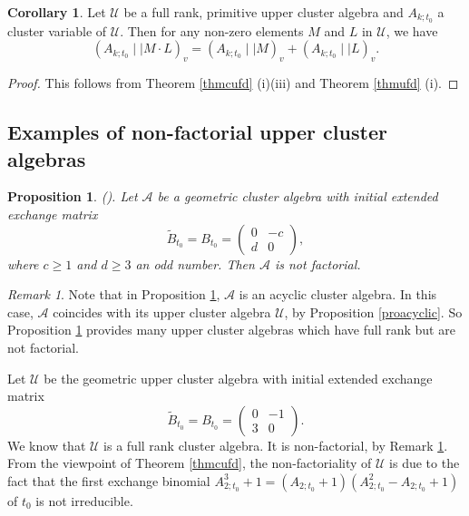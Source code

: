 \documentclass{amsart}
\newtheorem{proposition}[theorem]{Proposition}
\theoremstyle{definition}
\newtheorem{corollary}[theorem]{Corollary}
\theoremstyle{remark}
\newtheorem{remark}[theorem]{Remark}
\numberwithin{equation}{section}
\begin{document}
\begin{corollary}\label{corzp}
Let $\mathcal U$ be a full rank, primitive upper cluster algebra and $A_{k;t_0}$ a cluster variable of $\mathcal U$. Then for any non-zero elements $M$ and $L$ in $\mathcal U$, we have
$$(A_{k;t_0}\mid\mid M\cdot L)_v=(A_{k;t_0}\mid\mid M)_v+(A_{k;t_0}\mid\mid L)_v.$$
\end{corollary}
\begin{proof}
This follows from Theorem \ref{thmcufd} (i)(iii) and Theorem \ref{thmufd} (i).
\end{proof}




\subsection{Examples of non-factorial upper cluster algebras}\label{sec43}


\begin{proposition}{\rm (}\cite[Corollary 6.5]{GLS13}{\rm ).}
\label{corgls}
Let $\mathcal A$ be a geometric cluster algebra with initial extended exchange matrix $$\widetilde B_{t_0}= B_{t_0}=\begin{pmatrix}0&-c\\d&0\end{pmatrix},$$
where $c\geq1$ and $d\geq3$ an odd number. Then $\mathcal A$ is not factorial.
\end{proposition}


\begin{remark}\label{rmknonfactorial}
Note that in Proposition \ref{corgls}, $\mathcal A$ is an acyclic cluster algebra. In this case, $\mathcal A$ coincides with its upper cluster algebra $\mathcal U$, by Proposition \ref{proacyclic}. So Proposition \ref{corgls} provides many upper cluster algebras which have full rank but are not factorial.
\end{remark}

Let $\mathcal U$ be the  geometric upper cluster algebra with initial extended exchange matrix $$\widetilde B_{t_0}= B_{t_0}=\begin{pmatrix}0&-1\\3&0\end{pmatrix}.$$
We know that $\mathcal U$ is a full rank cluster algebra.  It is non-factorial, by Remark \ref{rmknonfactorial}. From the viewpoint of Theorem \ref{thmcufd}, the non-factoriality of $\mathcal U$ is due to the fact that the first exchange binomial $A_{2;t_0}^3+1=(A_{2;t_0}+1)(A_{2;t_0}^2-A_{2;t_0}+1)$ of $t_0$ is not irreducible.
\end{document}

